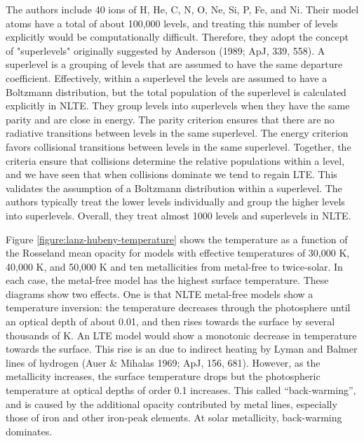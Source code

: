 The authors include 40 ions of H, He, C, N, O, Ne, Si, P, Fe, and Ni. Their model atoms have a total of about 100,000 levels, and treating this number of levels explicitly would be computationally difficult. Therefore, they adopt the concept of "superlevels" originally suggested by Anderson (1989; ApJ, 339, 558). A superlevel is a grouping of levels that are assumed to have the same departure coefficient. Effectively, within a superlevel the levels are assumed to have a Boltzmann distribution, but the total population of the superlevel is calculated explicitly in NLTE. They group levels into superlevels when they have the same parity and are close in energy. The parity criterion ensures that there are no radiative transitions between levels in the same superlevel. The energy criterion favors collisional transitions between levels in the same superlevel. Together, the criteria ensure that collisions determine the relative populations within a level, and we have seen that when collisions dominate we tend to regain LTE. This validates the assumption of a Boltzmann distribution within a superlevel. The authors typically treat the lower levels individually and group the higher levels into superlevels. Overall, they treat almost 1000 levels and superlevels in NLTE.

Figure \ref{figure:lanz-hubeny-temperature}
 shows the temperature as a function of the Rosseland mean opacity for models with effective temperatures of 30,000 K, 40,000 K, and 50,000 K and ten metallicities from metal-free to twice-solar. In each case, the metal-free model has the highest surface temperature. These diagrams show two effects. One is that NLTE metal-free models show a temperature inversion: the temperature decreases through the photosphere until an optical depth of about 0.01, and then rises  towards the surface by several thousands of K. An LTE model would show a monotonic decrease in temperature towards the surface. This rise is an due to indirect heating by Lyman and Balmer lines of hydrogen (Auer \& Mihalas 1969; ApJ, 156, 681). However, as the metallicity increases, the surface temperature drops but the  photospheric temperature at optical depths of order 0.1 increases. This called  “back-warming”, and is caused by the additional opacity contributed by metal lines, especially those of iron and other iron-peak elements. At solar metallicity, back-warming dominates.

